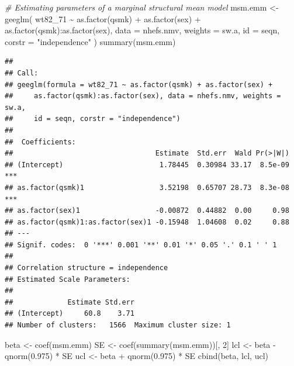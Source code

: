 \documentclass[
  10pt,
]{book}
\newenvironment{Shaded}{\begin{snugshade}}{\end{snugshade}}
\newcommand{\AttributeTok}[1]{\textcolor[rgb]{0.77,0.63,0.00}{#1}}
\newcommand{\CommentTok}[1]{\textcolor[rgb]{0.56,0.35,0.01}{\textit{#1}}}
\newcommand{\DecValTok}[1]{\textcolor[rgb]{0.00,0.00,0.81}{#1}}
\newcommand{\FloatTok}[1]{\textcolor[rgb]{0.00,0.00,0.81}{#1}}
\newcommand{\FunctionTok}[1]{\textcolor[rgb]{0.00,0.00,0.00}{#1}}
\newcommand{\NormalTok}[1]{#1}
\newcommand{\OtherTok}[1]{\textcolor[rgb]{0.56,0.35,0.01}{#1}}
\newcommand{\SpecialCharTok}[1]{\textcolor[rgb]{0.00,0.00,0.00}{#1}}
\newcommand{\StringTok}[1]{\textcolor[rgb]{0.31,0.60,0.02}{#1}}
\begin{document}
\begin{Shaded}
\begin{Highlighting}[]
\CommentTok{\# Estimating parameters of a marginal structural mean model}
\NormalTok{msm.emm }\OtherTok{\textless{}{-}} \FunctionTok{geeglm}\NormalTok{(}
\NormalTok{  wt82\_71 }\SpecialCharTok{\textasciitilde{}} \FunctionTok{as.factor}\NormalTok{(qsmk) }\SpecialCharTok{+} \FunctionTok{as.factor}\NormalTok{(sex)}
  \SpecialCharTok{+} \FunctionTok{as.factor}\NormalTok{(qsmk)}\SpecialCharTok{:}\FunctionTok{as.factor}\NormalTok{(sex),}
  \AttributeTok{data =}\NormalTok{ nhefs.nmv,}
  \AttributeTok{weights =}\NormalTok{ sw.a,}
  \AttributeTok{id =}\NormalTok{ seqn,}
  \AttributeTok{corstr =} \StringTok{"independence"}
\NormalTok{)}
\FunctionTok{summary}\NormalTok{(msm.emm)}
\end{Highlighting}
\end{Shaded}

\begin{verbatim}
## 
## Call:
## geeglm(formula = wt82_71 ~ as.factor(qsmk) + as.factor(sex) + 
##     as.factor(qsmk):as.factor(sex), data = nhefs.nmv, weights = sw.a, 
##     id = seqn, corstr = "independence")
## 
##  Coefficients:
##                                  Estimate  Std.err  Wald Pr(>|W|)    
## (Intercept)                       1.78445  0.30984 33.17  8.5e-09 ***
## as.factor(qsmk)1                  3.52198  0.65707 28.73  8.3e-08 ***
## as.factor(sex)1                  -0.00872  0.44882  0.00     0.98    
## as.factor(qsmk)1:as.factor(sex)1 -0.15948  1.04608  0.02     0.88    
## ---
## Signif. codes:  0 '***' 0.001 '**' 0.01 '*' 0.05 '.' 0.1 ' ' 1
## 
## Correlation structure = independence 
## Estimated Scale Parameters:
## 
##             Estimate Std.err
## (Intercept)     60.8    3.71
## Number of clusters:   1566  Maximum cluster size: 1
\end{verbatim}

\begin{Shaded}
\begin{Highlighting}[]
\NormalTok{beta }\OtherTok{\textless{}{-}} \FunctionTok{coef}\NormalTok{(msm.emm)}
\NormalTok{SE }\OtherTok{\textless{}{-}} \FunctionTok{coef}\NormalTok{(}\FunctionTok{summary}\NormalTok{(msm.emm))[, }\DecValTok{2}\NormalTok{]}
\NormalTok{lcl }\OtherTok{\textless{}{-}}\NormalTok{ beta }\SpecialCharTok{{-}} \FunctionTok{qnorm}\NormalTok{(}\FloatTok{0.975}\NormalTok{) }\SpecialCharTok{*}\NormalTok{ SE}
\NormalTok{ucl }\OtherTok{\textless{}{-}}\NormalTok{ beta }\SpecialCharTok{+} \FunctionTok{qnorm}\NormalTok{(}\FloatTok{0.975}\NormalTok{) }\SpecialCharTok{*}\NormalTok{ SE}
\FunctionTok{cbind}\NormalTok{(beta, lcl, ucl)}
\end{Highlighting}
\end{Shaded}
\end{document}
